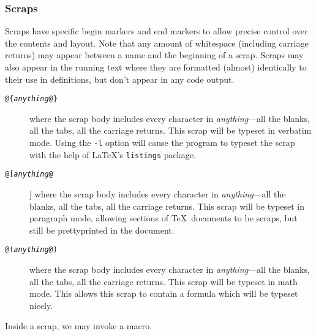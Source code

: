 \documentclass{report}
\begin{document}
\subsubsection{Scraps}

Scraps have specific begin markers and end markers to allow precise
control over the contents and layout. Note that any amount of
whitespace (including carriage returns) may appear between a name and
the beginning of a scrap. Scraps may also appear in the running text
where they are formatted (almost) identically to their use in definitions,
but don't appear in any code output.
\begin{description}
\item[\tt @\{{\em anything\/}@\}] where the scrap body includes every
  character in {\em anything\/}---all the blanks, all the tabs, all the
  carriage returns.  This scrap will be typeset in verbatim mode. Using the
  \texttt{-l} option will cause the program to typeset the scrap with
  the help of \LaTeX's \texttt{listings} package.
\item[\tt @[{\em anything\/}@]] where the scrap body includes every
  character in {\em anything\/}---all the blanks, all the tabs, all the
  carriage returns.  This scrap will be typeset in paragraph mode, allowing
  sections of \TeX\ documents to be scraps, but still  be prettyprinted
  in the document.
\item[\tt @({\em anything\/}@)] where the scrap body includes every
  character in {\em anything\/}---all the blanks, all the tabs, all the
  carriage returns.  This scrap will be typeset in math mode.  This allows
  this scrap to contain a formula which will be typeset nicely.
\end{description}
Inside a scrap, we may invoke a macro.
\end{document}

